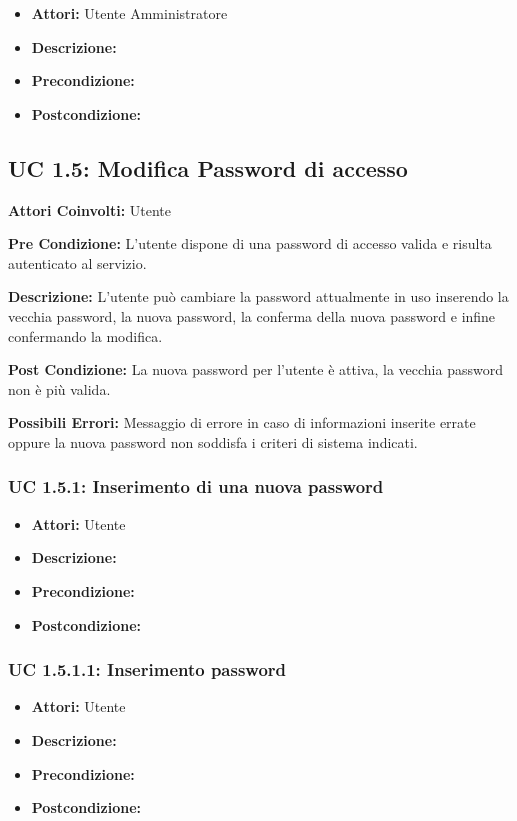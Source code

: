 \begin{itemize}
\item \textbf{Attori:} Utente Amministratore
\item \textbf{Descrizione:} 
\item \textbf{Precondizione:} 
\item \textbf{Postcondizione:} 
\end{itemize}



\subsection{UC 1.5: Modifica Password di accesso}

\textbf{Attori Coinvolti:}
Utente

\textbf{Pre Condizione:}
L'utente dispone di una password di accesso valida e risulta autenticato al servizio.

\textbf{Descrizione:}
L'utente può cambiare la password attualmente in uso inserendo la vecchia password, la nuova password, la conferma della nuova password e infine confermando la modifica.

\textbf{Post Condizione:}
La nuova password per l'utente è attiva, la vecchia password non è più valida.

\textbf{Possibili Errori:}
Messaggio di errore in caso di informazioni inserite errate oppure la nuova password non soddisfa i criteri di sistema indicati.

\subsubsection{UC 1.5.1: Inserimento di una nuova password}

\begin{itemize}
\item \textbf{Attori:} Utente
\item \textbf{Descrizione:} 
\item \textbf{Precondizione:} 
\item \textbf{Postcondizione:} 
\end{itemize}

\subsubsection{UC 1.5.1.1: Inserimento password}

\begin{itemize}
\item \textbf{Attori:} Utente
\item \textbf{Descrizione:} 
\item \textbf{Precondizione:} 
\item \textbf{Postcondizione:} 
\end{itemize}

